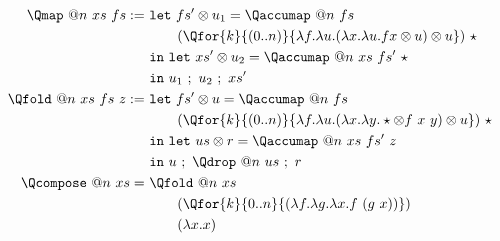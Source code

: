 \begin{table}[htbp]  
  \begin{align*}
  \Qmap\ @n\ xs\ fs :=\ 
    & \mathtt{let}\ {fs'\otimes u_1} = \Qaccumap\ @n\ fs\\
    & \qquad (\Qfor{k}{(0..n)}{\lambda f. \lambda u. (\lambda x.\lambda  u. f x \otimes u) \otimes u})\ \star\\
    & \mathtt{in\ let}\ {xs'\otimes u_2} = \Qaccumap\ @n\ xs\ fs'\ \star\\
    & \mathtt{in}\ {u_1\ ;\ u_2\ ;\ xs'}\\
  \Qfold\ @n\ xs\ fs\ z :=\ 
    & \mathtt{let}\ {fs'\otimes u} = \Qaccumap\ @n\ fs\\
    & \qquad (\Qfor{k}{(0..n)}{\lambda f. \lambda u. (\lambda x.\lambda  y. \star \otimes f\  x\  y) \otimes u})\ \star\\
    & \mathtt{in\ let}\ {us\otimes r} = \Qaccumap\ @n\ xs\ fs'\ z\\
    & \mathtt{in}\ {u\ ;\ \Qdrop\ @n\ us\ ;\ r}\\
  \Qcompose\ @n\ xs=\ 
    &\Qfold\ @n\ xs \\
    &\qquad (\Qfor{k}{0..n}{(\lambda f.\lambda g.\lambda x. f\ (g\ x))})\\
    &\qquad (\lambda x. x)\\
  \end{align*}
  \caption{Function macros.}
  \label{fig:function-macros}
\end{table}
